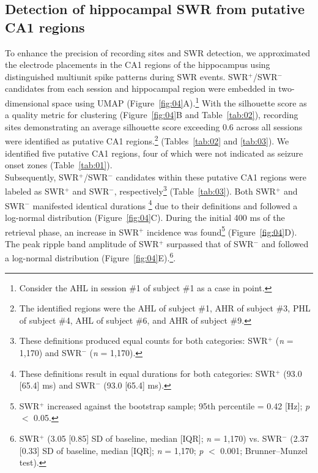 \documentclass[final,3p,times,twocolumn]{elsarticle}
\begin{document}
\subsection{Detection of hippocampal SWR from putative CA1 regions}
To enhance the precision of recording sites and SWR detection, we approximated the electrode placements in the CA1 regions of the hippocampus using distinguished multiunit spike patterns during SWR events. SWR$^+$/SWR$^-$ candidates from each session and hippocampal region were embedded in two-dimensional space using UMAP (Figure~\ref{fig:04}A).\footnote{Consider the AHL in session \#1 of subject \#1 as a case in point.} With the silhouette score as a quality metric for clustering (Figure~\ref{fig:04}B and Table~\ref{tab:02}), recording sites demonstrating an average silhouette score exceeding 0.6 across all sessions were identified as putative CA1 regions.\footnote{The identified regions were the AHL of subject \#1, AHR of subject \#3, PHL of subject \#4, AHL of subject \#6, and AHR of subject \#9.} (Tables~\ref{tab:02} and \ref{tab:03}). We identified five putative CA1 regions, four of which were not indicated as seizure onset zones (Table~\ref{tab:01}).
\\
\indent
Subsequently, SWR$^+$/SWR$^-$ candidates within these putative CA1 regions were labeled as SWR$^+$ and SWR$^-$, respectively\footnote{These definitions produced equal counts for both categories: SWR$^+$ (\textit{n} = 1,170) and SWR$^-$ (\textit{n} = 1,170).} (Table~\ref{tab:03}). Both SWR$^+$ and SWR$^-$ manifested identical durations \footnote{These definitions result in equal durations for both categories: SWR$^+$ (93.0 [65.4] ms) and SWR$^-$ (93.0 [65.4] ms).} due to their definitions and followed a log-normal distribution (Figure~\ref{fig:04}C). During the initial 400 ms of the retrieval phase, an increase in SWR$^+$ incidence was found\footnote{SWR$^+$ increased against the bootstrap sample; 95th percentile = 0.42 [Hz]; \textit{p} $<$ 0.05.} (Figure~\ref{fig:04}D). The peak ripple band amplitude of SWR$^+$ surpassed that of SWR$^-$ and followed a log-normal distribution (Figure~\ref{fig:04}E).\footnote{SWR$^+$ (3.05 [0.85] SD of baseline, median [IQR]; \textit{n} = 1,170) vs. SWR$^-$ (2.37 [0.33] SD of baseline, median [IQR]; \textit{n} = 1,170; \textit{p} $<$ 0.001; Brunner--Munzel test).}.
\end{document}
